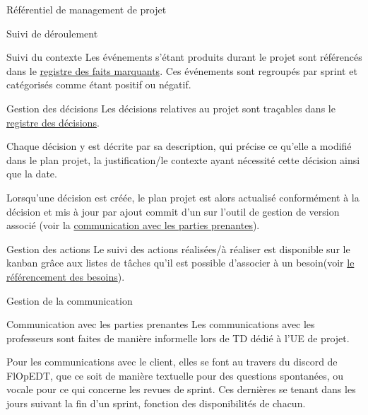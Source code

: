 \documentclass[]{article}
\begin{document}
{\begin{section}{\label{sec:Référentiel de management de projet}Référentiel de management de projet}
     \begin{subsection}{\label{sec:Suivi de déroulement}Suivi de déroulement}
         \begin{subsubsection}{\label{sec:Suivi du contexte}Suivi du contexte}
             Les événements s'étant produits durant le projet sont référencés dans le \href{documents/Registre_des_faits_marquants.pdf}{registre des faits marquants}. Ces événements sont regroupés par sprint et catégorisés comme étant positif ou négatif.
         \end{subsubsection}

         \begin{subsubsection}{\label{sec:Gestion des décision}Gestion des décisions}
             Les décisions relatives au projet sont traçables dans le \href{documents/Registre_des_décisions.pdf}{registre des décisions}.

             Chaque décision y est décrite par sa description, qui précise ce qu’elle a modifié dans le plan projet, la justification/le contexte ayant nécessité cette décision ainsi que la date.

             Lorsqu’une décision est créée, le plan projet est alors actualisé conformément à la décision et mis à jour par ajout commit d'un sur l’outil de gestion de version associé (voir la \hyperref[sec:Communication avec les parties prenantes]{communication avec les parties prenantes}).
         \end{subsubsection}

         \begin{subsubsection}{\label{sec:Gestion des actions}Gestion des actions}
             Le suivi des actions réalisées/à réaliser est disponible sur le kanban grâce aux listes de tâches qu’il est possible d’associer à un besoin(voir \hyperref[sec:Référencement des besoins]{le référencement des besoins}).
         \end{subsubsection}
     \end{subsection}

     \begin{subsection}{\label{sec:Gestion de la communication}Gestion de la communication}
         \begin{subsubsection}{\label{sec:Communication avec les parties prenantes}Communication avec les parties prenantes}
             Les communications avec les professeurs sont faites de manière informelle lors de TD dédié à l’UE de projet.

             Pour les communications avec le client, elles se font au travers du discord de FlOpEDT, que ce soit de manière textuelle pour des questions spontanées, ou vocale pour ce qui concerne les revues de sprint. Ces dernières se tenant dans les jours suivant la fin d’un sprint, fonction des disponibilités de chacun.


\end{subsubsection}
\end{subsection}
\end{section}}
\end{document}
